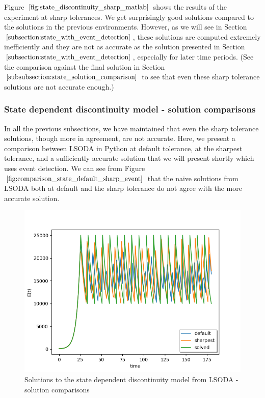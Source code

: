 Figure $\ref{fig:state_discontinuity_sharp_matlab}$ shows the results of the experiment at sharp tolerances. We get surprisingly good solutions compared to the solutions in the previous environments. However, as we will see in Section $\ref{subsection:state_with_event_detection}$, these solutions are computed extremely inefficiently and they are not as accurate as the solution presented in Section $\ref{subsection:state_with_event_detection}$, especially for later time periods. (See the comparison against the final solution in Section $\ref{subsubsection:state_solution_comparison}$ to see that even these sharp tolerance solutions are not accurate enough.)


\subsubsection{State dependent discontinuity model - solution comparisons}
\label{subsubsection:state_solution_comparison}
In all the previous subsections, we have maintained that even the sharp tolerance solutions, though more in agreement, are not accurate. Here, we present a comparison between LSODA in Python at default tolerance, at the sharpest tolerance, and a sufficiently accurate solution that we will present shortly which uses event detection. We can see from Figure $\ref{fig:comparison_state_default_sharp_event}$ that the naive solutions from LSODA both at default and the sharp tolerance do not agree with the more accurate solution. 

\begin{figure}[H]
\centering
\includegraphics[width=0.7\linewidth]{./figures/comparison_state_default_sharp_event}
\caption{Solutions to the state dependent discontinuity model from LSODA - solution comparisons}
\label{fig:comparison_state_default_sharp_event}
\end{figure}


